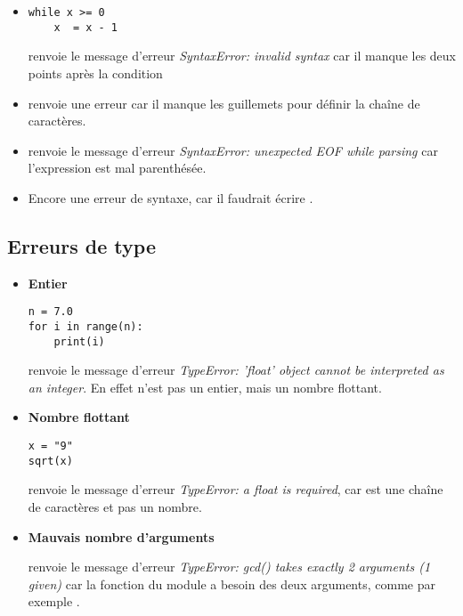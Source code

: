 \documentclass[11pt,class=report,crop=false]{standalone}
\begin{document}
\begin{itemize}
   \item 
\begin{lstlisting}
while x >= 0
    x  = x - 1
\end{lstlisting}

\Python{} renvoie le message d'erreur \emph{SyntaxError: invalid syntax} car il manque les deux points après la condition 

  \item {} renvoie une erreur car il manque les guillemets pour définir la chaîne de caractères. 
  

  \item {} \quad \Python{} renvoie le message d'erreur \emph{SyntaxError: unexpected EOF while parsing} car l'expression est mal parenthésée.

  \item {} \quad Encore une erreur de syntaxe, car il faudrait écrire .
\end{itemize}


\subsection{Erreurs de type}

\begin{itemize}
   \item \textbf{Entier}
\begin{lstlisting}
n = 7.0
for i in range(n):
    print(i)
\end{lstlisting}

\Python{} renvoie le message d'erreur \emph{TypeError: 'float' object cannot be interpreted as an integer}. En effet  n'est pas un entier, mais un nombre flottant. 

  \item \textbf{Nombre flottant}
\begin{lstlisting}
x = "9"
sqrt(x)
\end{lstlisting} 
  \Python{} renvoie le message d'erreur \emph{TypeError: a float is required}, car   est une chaîne de caractères et pas un nombre.
  
  \item \textbf{Mauvais nombre d'arguments}
  
   \quad \Python{} renvoie le message d'erreur \emph{TypeError: gcd() takes exactly 2 arguments (1 given)}
  car la fonction  du module  a besoin des deux arguments, comme par exemple .
  

 

 \end{itemize}
\end{document}
